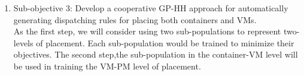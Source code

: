 \begin{enumerate}


	\item Sub-objective 3: Develop a cooperative GP-HH approach for automatically generating dispatching rules for placing both containers and VMs. \\
	As the first step, we will consider using two sub-populations to represent two-levels of placement. Each sub-population would be trained to minimize their objectives. The second step,the sub-population in the container-VM level will be used in training the VM-PM level of placement. 



	\end{enumerate}


